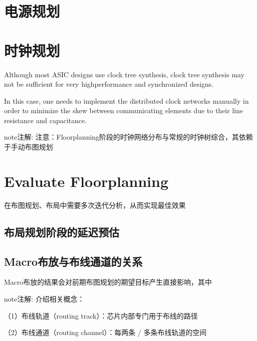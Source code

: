 \documentclass[letterpaper,10pt,english]{sphinxmanual}
\begin{document}
\section{电源规划}
\label{\detokenize{chapter5/_u7535_u6e90_u89c4_u5212:id1}}\label{\detokenize{chapter5/_u7535_u6e90_u89c4_u5212::doc}}

\section{时钟规划}
\label{\detokenize{chapter5/_u65f6_u949f_u89c4_u5212:id1}}\label{\detokenize{chapter5/_u65f6_u949f_u89c4_u5212::doc}}
\sphinxAtStartPar
Although most ASIC designs use clock tree synthesis, clock tree synthesis
may not be sufficient for very high\sphinxhyphen{}performance and synchronized designs.

\sphinxAtStartPar
In this case, one needs to implement the distributed clock networks manually
in order to minimize the skew between communicating elements due to their
line resistance and capacitance.

\begin{sphinxadmonition}{note}{注解:}
\sphinxAtStartPar
注意：Floorplanning阶段的时钟网络分布与常规的时钟树综合，其依赖于手动布图规划
\end{sphinxadmonition}


\section{Evaluate Floorplanning}
\label{\detokenize{chapter5/Floorplanning_u7684_u8bc4_u4f30:evaluate-floorplanning}}\label{\detokenize{chapter5/Floorplanning_u7684_u8bc4_u4f30::doc}}
\sphinxAtStartPar
在布图规划、布局中需要多次迭代分析，从而实现最佳效果


\subsection{布局规划阶段的延迟预估}
\label{\detokenize{chapter5/Floorplanning_u7684_u8bc4_u4f30:id1}}

\subsection{Macro布放与布线通道的关系}
\label{\detokenize{chapter5/Floorplanning_u7684_u8bc4_u4f30:macro}}
\sphinxAtStartPar
Macro布放的结果会对前期布图规划的期望目标产生直接影响，其中 

\begin{sphinxadmonition}{note}{注解:}
\sphinxAtStartPar
介绍相关概念：

\sphinxAtStartPar
（1）布线轨道（routing track）：芯片内部专门用于布线的路径

\sphinxAtStartPar
（2）布线通道（routing channel）：每两条 / 多条布线轨道的空间
\end{sphinxadmonition}
\end{document}
